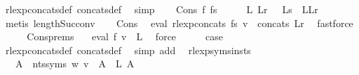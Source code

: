 \begin{isabellebody}
\ rlexp{\isacharunderscore}{\kern0pt}concats{\isacharunderscore}{\kern0pt}def\ concats{\isacharunderscore}{\kern0pt}def\ \isamarkupfalse%
\ simp\isanewline
{}\isamarkupfalse%
\isanewline
\ \ \isamarkupfalse%
\ {\isacharparenleft}{\kern0pt}Cons\ f{}\ fs{\isacharparenright}{\kern0pt}\isanewline
\ \ \isamarkupfalse%
\ \isamarkupfalse%
\ L{}\ Lr\ \ {\isacharasterisk}{\kern0pt}{\isacharcolon}{\kern0pt}\ {\isachardoublequoteopen}Ls\ {\isacharequal}{\kern0pt}\ L{}{\isacharhash}{\kern0pt}Lr{\isachardoublequoteclose}\ \isamarkupfalse%
\ {\isacharparenleft}{\kern0pt}metis\ length{\isacharunderscore}{\kern0pt}Suc{\isacharunderscore}{\kern0pt}conv{\isacharparenright}{\kern0pt}\isanewline
\ \ \isamarkupfalse%
\ Cons\ \isamarkupfalse%
\ {\isachardoublequoteopen}eval\ {\isacharparenleft}{\kern0pt}rlexp{\isacharunderscore}{\kern0pt}concats\ fs{\isacharparenright}{\kern0pt}\ v\ {\isacharequal}{\kern0pt}\ concats\ Lr{\isachardoublequoteclose}\ \isamarkupfalse%
\ fastforce\isanewline
\ \ \isamarkupfalse%
\ \isamarkupfalse%
\ Cons{\isachardot}{\kern0pt}prems\ {\isacharasterisk}{\kern0pt}\ \isamarkupfalse%
\ {\isachardoublequoteopen}eval\ f{}\ v\ {\isacharequal}{\kern0pt}\ L{}{\isachardoublequoteclose}\ \isamarkupfalse%
\ force\isanewline
\ \ \isamarkupfalse%
\ \isamarkupfalse%
\ {\isacharquery}{\kern0pt}case\ \isamarkupfalse%
\ rlexp{\isacharunderscore}{\kern0pt}concats{\isacharunderscore}{\kern0pt}def\ concats{\isacharunderscore}{\kern0pt}def\ \isamarkupfalse%
\ {\isacharparenleft}{\kern0pt}simp\ add{\isacharcolon}{\kern0pt}\ {\isachardoublequoteopen}{\isacharasterisk}{\kern0pt}{\isachardoublequoteclose}{\isacharparenright}{\kern0pt}\isanewline
{}\isamarkupfalse%
%
\endisatagproof
{\isafoldproof}%
%
\isadelimproof
\isanewline
%
\endisadelimproof
\isanewline
{}\isamarkupfalse%
\ rlexp{\isacharunderscore}{\kern0pt}syms{\isacharunderscore}{\kern0pt}insts{\isacharcolon}{\kern0pt}\isanewline
\ \ \ {\isachardoublequoteopen}{\isasymforall}A\ {\isasymin}\ nts{\isacharunderscore}{\kern0pt}syms\ w{\isachardot}{\kern0pt}\ v\ {\isacharparenleft}{\kern0pt}{\isasymgamma}{\isacharprime}{\kern0pt}\ A{\isacharparenright}{\kern0pt}\ {\isacharequal}{\kern0pt}\ L\ A{\isachardoublequoteclose}\isanewline

\end{isabellebody}
